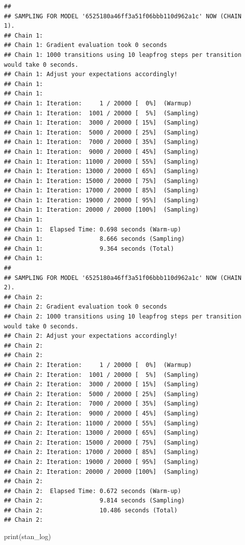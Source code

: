 \documentclass[
]{book}
\newenvironment{Shaded}{\begin{snugshade}}{\end{snugshade}}
\newcommand{\FunctionTok}[1]{\textcolor[rgb]{0.00,0.00,0.00}{#1}}
\newcommand{\NormalTok}[1]{#1}
\begin{document}
\begin{verbatim}
## 
## SAMPLING FOR MODEL '6525180a46ff3a51f06bbb110d962a1c' NOW (CHAIN 1).
## Chain 1: 
## Chain 1: Gradient evaluation took 0 seconds
## Chain 1: 1000 transitions using 10 leapfrog steps per transition would take 0 seconds.
## Chain 1: Adjust your expectations accordingly!
## Chain 1: 
## Chain 1: 
## Chain 1: Iteration:     1 / 20000 [  0%]  (Warmup)
## Chain 1: Iteration:  1001 / 20000 [  5%]  (Sampling)
## Chain 1: Iteration:  3000 / 20000 [ 15%]  (Sampling)
## Chain 1: Iteration:  5000 / 20000 [ 25%]  (Sampling)
## Chain 1: Iteration:  7000 / 20000 [ 35%]  (Sampling)
## Chain 1: Iteration:  9000 / 20000 [ 45%]  (Sampling)
## Chain 1: Iteration: 11000 / 20000 [ 55%]  (Sampling)
## Chain 1: Iteration: 13000 / 20000 [ 65%]  (Sampling)
## Chain 1: Iteration: 15000 / 20000 [ 75%]  (Sampling)
## Chain 1: Iteration: 17000 / 20000 [ 85%]  (Sampling)
## Chain 1: Iteration: 19000 / 20000 [ 95%]  (Sampling)
## Chain 1: Iteration: 20000 / 20000 [100%]  (Sampling)
## Chain 1: 
## Chain 1:  Elapsed Time: 0.698 seconds (Warm-up)
## Chain 1:                8.666 seconds (Sampling)
## Chain 1:                9.364 seconds (Total)
## Chain 1: 
## 
## SAMPLING FOR MODEL '6525180a46ff3a51f06bbb110d962a1c' NOW (CHAIN 2).
## Chain 2: 
## Chain 2: Gradient evaluation took 0 seconds
## Chain 2: 1000 transitions using 10 leapfrog steps per transition would take 0 seconds.
## Chain 2: Adjust your expectations accordingly!
## Chain 2: 
## Chain 2: 
## Chain 2: Iteration:     1 / 20000 [  0%]  (Warmup)
## Chain 2: Iteration:  1001 / 20000 [  5%]  (Sampling)
## Chain 2: Iteration:  3000 / 20000 [ 15%]  (Sampling)
## Chain 2: Iteration:  5000 / 20000 [ 25%]  (Sampling)
## Chain 2: Iteration:  7000 / 20000 [ 35%]  (Sampling)
## Chain 2: Iteration:  9000 / 20000 [ 45%]  (Sampling)
## Chain 2: Iteration: 11000 / 20000 [ 55%]  (Sampling)
## Chain 2: Iteration: 13000 / 20000 [ 65%]  (Sampling)
## Chain 2: Iteration: 15000 / 20000 [ 75%]  (Sampling)
## Chain 2: Iteration: 17000 / 20000 [ 85%]  (Sampling)
## Chain 2: Iteration: 19000 / 20000 [ 95%]  (Sampling)
## Chain 2: Iteration: 20000 / 20000 [100%]  (Sampling)
## Chain 2: 
## Chain 2:  Elapsed Time: 0.672 seconds (Warm-up)
## Chain 2:                9.814 seconds (Sampling)
## Chain 2:                10.486 seconds (Total)
## Chain 2:
\end{verbatim}

\begin{Shaded}
\begin{Highlighting}[]
\FunctionTok{print}\NormalTok{(stan\_log)}
\end{Highlighting}
\end{Shaded}
\end{document}
